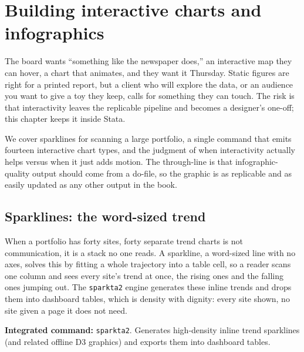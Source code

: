 \documentclass[
    a4paper,
    fontsize=10pt,
    twoside=true,
    numbers=noenddot,
]{kaobook}
\begin{document}
\chapter{Building interactive charts and infographics}\label{ch:interactive}

The board wants \enquote{something like the newspaper does,} an interactive map they can hover, a chart that animates, and they want it Thursday. Static figures are right for a printed report, but a client who will explore the data, or an audience you want to give a toy they keep, calls for something they can touch. The risk is that interactivity leaves the replicable pipeline and becomes a designer's one-off; this chapter keeps it inside Stata.

We cover sparklines for scanning a large portfolio, a single command that emits fourteen interactive chart types, and the judgment of when interactivity actually helps versus when it just adds motion. The through-line is that infographic-quality output should come from a do-file, so the graphic is as replicable and as easily updated as any other output in the book.

\section{Sparklines: the word-sized trend}
When a portfolio has forty sites, forty separate trend charts is not communication, it is a stack no one reads. A sparkline, a word-sized line with no axes, solves this by fitting a whole trajectory into a table cell, so a reader scans one column and sees every site's trend at once, the rising ones and the falling ones jumping out. The \texttt{sparkta2} engine generates these inline trends and drops them into dashboard tables, which is density with dignity: every site shown, no site given a page it does not need.

\begin{kaobox}[frametitle=Package Integration: \texttt{sparkta2}]
\textbf{Integrated command:} \texttt{sparkta2}. Generates high-density inline trend sparklines (and related offline D3 graphics) and exports them into dashboard tables. %
\end{kaobox}
\end{document}
